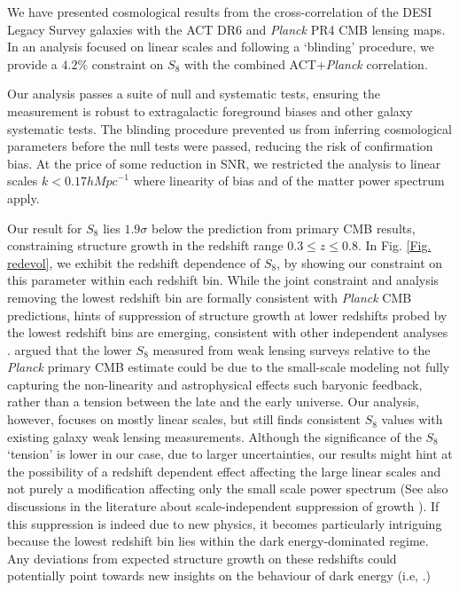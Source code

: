 \documentclass[twocolumn]{aastex631}
\begin{document}
{We have presented cosmological results from the cross-correlation of the DESI Legacy Survey galaxies with the ACT DR6 and \textit{Planck} PR4 CMB lensing maps. In an analysis focused on linear scales and following a `blinding' procedure, we provide a $4.2\%$ constraint on $S_8$ with the combined ACT+\textit{Planck} correlation. 

Our analysis passes a suite of null and systematic tests, ensuring the measurement is robust to extragalactic foreground biases and other galaxy systematic tests. The blinding procedure prevented us from inferring cosmological parameters before the null tests were passed, reducing the risk of confirmation bias. At the price of some reduction in SNR, we restricted the analysis to linear scales $k<0.17h\si{Mpc}^{-1}$ where linearity of bias and of the matter power spectrum apply.


Our result for $S_8$ lies $1.9\sigma$ below the prediction from primary CMB results, constraining structure growth in the redshift range $0.3\leq{z}\leq0.8$. In Fig. \ref{Fig. redevol}, we exhibit the redshift dependence of $S_8$, by showing our constraint on this parameter within each redshift bin. While the joint constraint and analysis removing the lowest redshift bin are formally consistent with \textit{Planck} CMB predictions, hints of suppression of structure growth at lower redshifts probed by the lowest redshift bins are emerging, consistent with other independent analyses \citep[i.e., ][]{Sailer2024, Kim2024}.  \cite{2022MNRAS.516.5355A, 2023MNRAS.525.5554P} argued that the lower $S_8$ measured from weak lensing surveys relative to the \textit{Planck} primary CMB estimate could be due to the small-scale modeling not fully capturing the non-linearity and astrophysical effects such baryonic feedback, rather than a tension between the late and the early universe. Our analysis, however, focuses on mostly linear scales, but still finds consistent $S_8$ values with existing galaxy weak lensing measurements. Although the significance of the $S_8$ `tension' is lower in our case, due to larger uncertainties, our results might hint at the possibility of a redshift dependent effect affecting the large linear scales and not purely a modification affecting only the small scale power spectrum (See also discussions in the literature  about scale-independent suppression of growth \citep{2023PhRvL.131k1001N}). If this suppression is indeed due to new physics, it becomes particularly intriguing because the lowest redshift bin lies within the dark energy-dominated regime. Any deviations from expected structure growth on these redshifts could potentially point towards new insights on the behaviour of dark energy (i.e, \citep{desicollaboration2024desi2024vicosmological}.)


}
\end{document}
